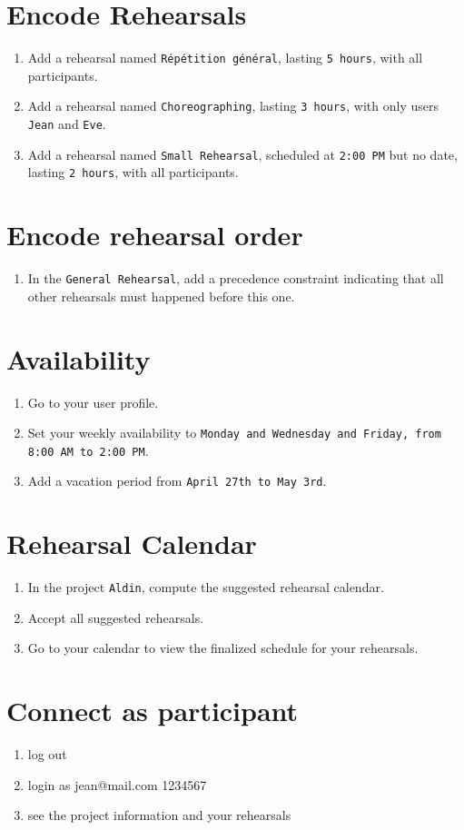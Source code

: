 \documentclass[11pt]{article}
\begin{document}
\section{Encode Rehearsals}
\begin{enumerate}
    \item Add a rehearsal named \texttt{Répétition général}, lasting \texttt{5 hours}, with all participants.
    \item Add a rehearsal named \texttt{Choreographing}, lasting \texttt{3 hours}, with only users \texttt{Jean} and \texttt{Eve}.
    \item Add a rehearsal named \texttt{Small Rehearsal}, scheduled at \texttt{2:00 PM} but no date, lasting \texttt{2 hours}, with all participants.
\end{enumerate}
\section{Encode rehearsal order}
\begin{enumerate}
    \item In the \texttt{General Rehearsal}, add a precedence constraint indicating that all other rehearsals must happened before this one.
\end{enumerate}
\section{Availability}
\begin{enumerate}
    \item Go to your user profile.
    \item Set your weekly availability to \texttt{Monday and Wednesday and Friday, from 8:00 AM to 2:00 PM}.
    \item Add a vacation period from \texttt{April 27th to May 3rd}.
\end{enumerate}

\section{Rehearsal Calendar}
\begin{enumerate}
    \item In the project \texttt{Aldin}, compute the suggested rehearsal calendar.
    \item Accept all suggested rehearsals.
    \item Go to your calendar to view the finalized schedule for your rehearsals.
\end{enumerate}

\section{Connect as participant}
\begin{enumerate}
    \item log out
    \item login as jean@mail.com 1234567
    \item see the project information and your rehearsals
\end{enumerate}
\end{document}
